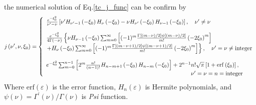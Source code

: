the numerical solution of Eq.\eqref{tc_j_func} can be confirm by
\begin{equation}
j\left(\nu^{\prime}, \nu, \xi_{0}\right)=\left\{
  \begin{array}{l}
    \frac{e^{-\xi_{0}^{2}}}{\nu^{\prime}-\nu}\left[\nu^{\prime} H_{\nu^{\prime}-1}\left(-\xi_{0}\right) H_{\nu}\left(-\xi_{0}\right)-\nu H_{\nu^{\prime}}\left(-\xi_{0}\right) H_{\nu-1}\left(-\xi_{0}\right)\right], \quad \nu^{\prime} \neq \nu \vspace{2.5ex} \\
    \frac{e^{-\xi_{0}^{2}}}{4 \Gamma(-\nu)}\left\{\nu H_{\nu-1}\left(-\xi_{0}\right) \sum_{m=0}^{\infty}\left[(-1)^{m} \frac{\Gamma[(m-\nu) / 2] \psi[(m-\nu) / 2]}{m !}\left(-2 \xi_{0}\right)^{m}\right]\right. \\
    \left.+H_{\nu}\left(-\xi_{0}\right) \sum_{m=0}^{\infty}\left[(-1)^{m} \frac{\Gamma[(m-\nu+1) / 2] \psi[(m-\nu+1) / 2]}{m !}\left(-2 \xi_{0}\right)^{m}\right]\right\}, \quad \nu^{\prime}=\nu \neq \text {integer} \vspace{2.5ex} \\
    e^{-\xi_{0}^{2}} \sum_{m=0}^{n-1}\left[2^{m} \frac{n !}{(n-1) !} H_{n-m+1}\left(-\xi_{0}\right) H_{n-m}\left(-\xi_{0}\right)\right]+2^{n-1} n ! \sqrt{\pi}\left[1+\operatorname{erf}\left(\xi_{0}\right)\right], \\
    \quad \quad \quad \quad \quad \quad \quad \quad \quad \quad \quad \quad \quad \quad \quad \quad \quad \quad \quad \quad \quad \quad \quad \quad \quad \nu^{\prime}=\nu=n=\text{integer}
  \end{array}\right.
\end{equation}
Where $\text{erf}(\varepsilon)$ is the error function, $H_n(\varepsilon)$ is Hermite polynomials, and $\psi(\nu) = \Gamma^\prime(\nu) / \Gamma(\nu)$ is \textit{Psi} function.

